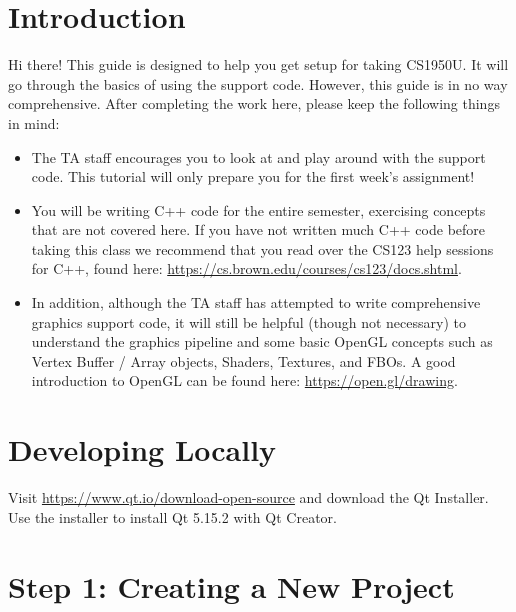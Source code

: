 \documentclass{cs195u}
\begin{document}
\section*{Introduction}
Hi there! This guide is designed to help you get setup for taking CS1950U. It will go through the basics of using the support code. However, this guide is in no way comprehensive. After completing the work here, please keep the following things in mind:

\begin{itemize}
\item The TA staff encourages you to look at and play around with the support code. This tutorial will only prepare you for the first week’s assignment!
\item You will be writing C++ code for the entire semester, exercising concepts that are not covered here. If you have not written much C++ code before taking this class we recommend that you read over the CS123 help sessions for C++, found here: \url{https://cs.brown.edu/courses/cs123/docs.shtml}.
\item In addition, although the TA staff has attempted to write comprehensive graphics support code, it will still be helpful (though not necessary) to understand the graphics pipeline and some basic OpenGL concepts such as Vertex Buffer / Array objects, Shaders, Textures, and FBOs. A good introduction to OpenGL can be found here: \url{https://open.gl/drawing}.
\end{itemize}

\section*{Developing Locally}

Visit \url{https://www.qt.io/download-open-source} and download the Qt Installer. Use the installer to install Qt 5.15.2 with Qt Creator. 

\section*{Step 1: Creating a New Project}
\end{document}
